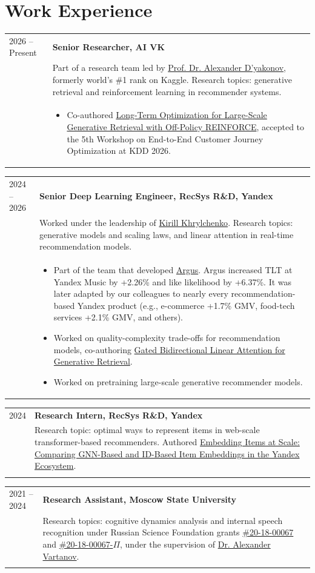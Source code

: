 \documentclass[10pt,letterpaper]{article}
\makeatletter
\newcommand{\cvsection}[1]{\section*{#1}}
\newcommand{\datedetailrow}[4]{%
  \begin{tabularx}{\textwidth}{@{}p{1.18in}X@{}}
    #1 & \textbf{#2}\\
       & #3\\
       & #4
  \end{tabularx}\vspace{0.18em}
}
\newcommand{\compactitem}[1]{\item #1}
\makeatother
\begin{document}
\cvsection{Work Experience}
\datedetailrow{2026 -- Present}{Senior Researcher, AI VK}{Part of a research team led by \href{https://www.kaggle.com/dyakonov}{Prof. Dr. Alexander D'yakonov}, formerly world's \#1 rank on Kaggle. Research topics: generative retrieval and reinforcement learning in recommender systems.}{
  \begin{itemize}
    \compactitem{Co-authored \href{https://neuralsrg.github.io/publication/2026-07-01-long-term-optimization}{Long-Term Optimization for Large-Scale Generative Retrieval with Off-Policy REINFORCE}, accepted to the 5th Workshop on End-to-End Customer Journey Optimization at KDD 2026.}
  \end{itemize}
}
\datedetailrow{2024 -- 2026}{Senior Deep Learning Engineer, RecSys R\&D, Yandex}{Worked under the leadership of \href{https://www.linkedin.com/in/kirill-khrylchenko/}{Kirill Khrylchenko}. Research topics: generative models and scaling laws, and linear attention in real-time recommendation models.}{
  \begin{itemize}
    \compactitem{Part of the team that developed \href{https://neuralsrg.github.io/publication/2026-07-05-argus}{Argus}. Argus increased TLT at Yandex Music by +2.26\% and like likelihood by +6.37\%. It was later adapted by our colleagues to nearly every recommendation-based Yandex product (e.g., e-commerce +1.7\% GMV, food-tech services +2.1\% GMV, and others).}
    \compactitem{Worked on quality-complexity trade-offs for recommendation models, co-authoring \href{https://neuralsrg.github.io/publication/2026-06-08-gbla}{Gated Bidirectional Linear Attention for Generative Retrieval}.}
    \compactitem{Worked on pretraining large-scale generative recommender models.}
  \end{itemize}
}
\datedetailrow{2024}{Research Intern, RecSys R\&D, Yandex}{Research topic: optimal ways to represent items in web-scale transformer-based recommenders. Authored \href{https://neuralsrg.github.io/publication/2024-06-01-gnns}{Embedding Items at Scale: Comparing GNN-Based and ID-Based Item Embeddings in the Yandex Ecosystem}.}{}
\datedetailrow{2021 -- 2024}{Research Assistant, Moscow State University}{Research topics: cognitive dynamics analysis and internal speech recognition under Russian Science Foundation grants \href{https://rscf.ru/project/LXjuaL8yl_MKyMwV-E0AYmYXKZ7dVATTIy5v_6WfDOq3PZJVv6H2gRUOxla_daUJ4bgTN-xp/}{\#20-18-00067} and \href{https://rscf.ru/project/OwNy03bhBYAiNgcRD1Lq9DYlzpziFaDtdi0LjD-lDfhmGp1fntBfNIA3DdjvFBf32QgMbnrg/}{\#20-18-00067-\(\Pi\)}, under the supervision of \href{https://www.researchgate.net/profile/Vartanov-Alexander}{Dr. Alexander Vartanov}.}{}
\end{document}
